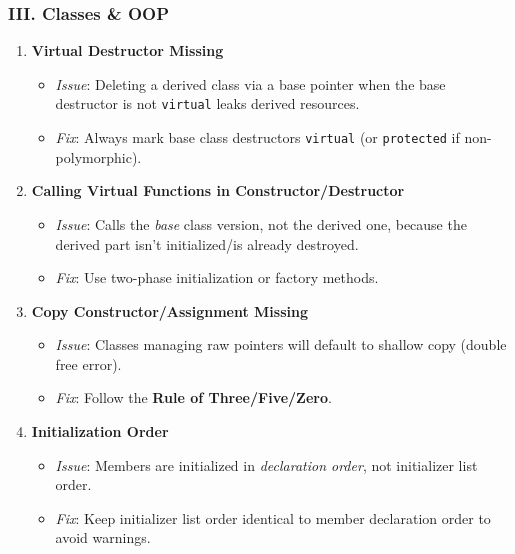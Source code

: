 \hypertarget{iii.-classes-oop}{%
\subsubsection{III. Classes \& OOP}\label{iii.-classes-oop}}

\begin{enumerate}
\def\labelenumi{\arabic{enumi}.}
\setcounter{enumi}{10}
\tightlist
\item
  \textbf{Virtual Destructor Missing}

  \begin{itemize}
  \tightlist
  \item
    \emph{Issue}: Deleting a derived class via a base pointer when the
    base destructor is not \passthrough{\lstinline!virtual!} leaks
    derived resources.
  \item
    \emph{Fix}: Always mark base class destructors
    \passthrough{\lstinline!virtual!} (or
    \passthrough{\lstinline!protected!} if non-polymorphic).
  \end{itemize}
\item
  \textbf{Calling Virtual Functions in Constructor/Destructor}

  \begin{itemize}
  \tightlist
  \item
    \emph{Issue}: Calls the \emph{base} class version, not the derived
    one, because the derived part isn't initialized/is already
    destroyed.
  \item
    \emph{Fix}: Use two-phase initialization or factory methods.
  \end{itemize}
\item
  \textbf{Copy Constructor/Assignment Missing}

  \begin{itemize}
  \tightlist
  \item
    \emph{Issue}: Classes managing raw pointers will default to shallow
    copy (double free error).
  \item
    \emph{Fix}: Follow the \textbf{Rule of Three/Five/Zero}.
  \end{itemize}
\item
  \textbf{Initialization Order}

  \begin{itemize}
  \tightlist
  \item
    \emph{Issue}: Members are initialized in \emph{declaration order},
    not initializer list order.
  \item
    \emph{Fix}: Keep initializer list order identical to member
    declaration order to avoid warnings.
  \end{itemize}
\end{enumerate}

